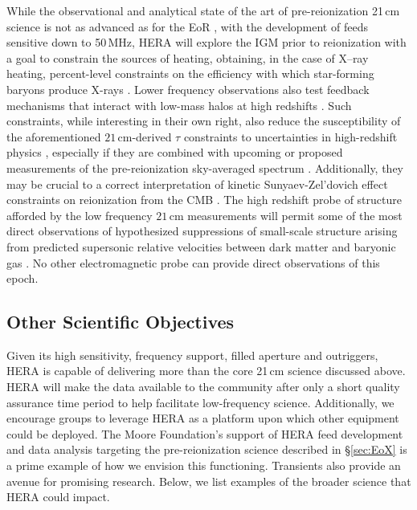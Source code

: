 \documentclass[preprint,11pt]{aastex}
\begin{document}
While the observational and analytical state of the art of pre-reionization 21\,cm science is not as advanced as for the EoR \citep{ewall-wice_et_al2016-EoXLimits}, 
with the development of feeds sensitive down to 50\,MHz, HERA will explore the IGM prior to
reionization with a goal to constrain the sources of heating, obtaining, in the case of
X--ray heating, percent-level constraints on the efficiency with which star-forming baryons
produce X-rays \citep{ewall-wice_et_al2015}. Lower
frequency observations also test feedback
mechanisms that interact with low-mass halos at high redshifts
\citep{Iliev_et_al2007,Iliev_et_al2012,ahn_et_al2012}.
Such constraints, while interesting in their own right, also reduce
the susceptibility of the aforementioned $21\,\textrm{cm}$-derived $\tau$
constraints to uncertainties in high-redshift physics \citep{liu_et_al2015}, especially if they are 
combined with upcoming or proposed measurements of 
the pre-reionization sky-averaged spectrum \citep{fialkov_and_loeb2016}. Additionally, they may be crucial to a correct
interpretation of kinetic Sunyaev-Zel'dovich effect constraints on reionization
from the CMB \citep{park_et_al2013}. The high redshift probe of
structure afforded by the low frequency $21\,\textrm{cm}$ measurements will
permit some of the most direct observations of hypothesized suppressions of
small-scale structure
\citep{dalal_et_al2010,tseliakhovich_et_al2011,fialkov_et_al2012} arising from
predicted supersonic relative velocities between dark matter and baryonic gas
\citep{tseliakhovich_and_hirata2010}. No other electromagnetic probe can provide direct observations of this
epoch. 


\subsection{Other Scientific Objectives}
\label{subsec:broader_science}

Given its high sensitivity, frequency support, filled aperture and outriggers, HERA is capable of delivering more than the core 21\,cm science discussed above.
HERA will make the data available to the community after only a short quality assurance time period to help facilitate low-frequency science.
Additionally, we encourage groups to leverage HERA as a platform upon which other equipment could be deployed. 
The Moore Foundation's support of HERA feed development and data analysis targeting the pre-reionization science described in \S\ref{sec:EoX}
is a prime example of how we envision this functioning.  Transients also provide an avenue for promising research.
Below, we list examples of the broader science that HERA could impact.
\end{document}
